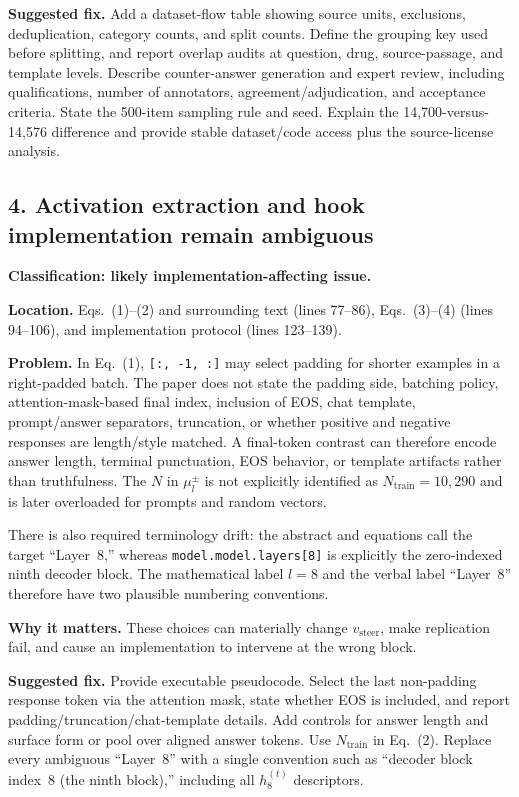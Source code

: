 \documentclass[11pt]{article}
\newcommand{\status}[1]{\textbf{#1}}
\begin{document}
\status{Suggested fix.} Add a dataset-flow table showing source units, exclusions, deduplication, category counts, and split counts.  Define the grouping key used before splitting, and report overlap audits at question, drug, source-passage, and template levels.  Describe counter-answer generation and expert review, including qualifications, number of annotators, agreement/adjudication, and acceptance criteria.  State the 500-item sampling rule and seed.  Explain the 14,700-versus-14,576 difference and provide stable dataset/code access plus the source-license analysis.

\subsection*{4. Activation extraction and hook implementation remain ambiguous}

\status{Classification: likely implementation-affecting issue.}

\status{Location.} Eqs.~(1)--(2) and surrounding text (lines 77--86), Eqs.~(3)--(4) (lines 94--106), and implementation protocol (lines 123--139).

\status{Problem.} In Eq.~(1), \texttt{[:, -1, :]} may select padding for shorter examples in a right-padded batch.  The paper does not state the padding side, batching policy, attention-mask-based final index, inclusion of EOS, chat template, prompt/answer separators, truncation, or whether positive and negative responses are length/style matched.  A final-token contrast can therefore encode answer length, terminal punctuation, EOS behavior, or template artifacts rather than truthfulness.  The $N$ in $\mu_l^\pm$ is not explicitly identified as $N_{\mathrm{train}}=10{,}290$ and is later overloaded for prompts and random vectors.

There is also required terminology drift: the abstract and equations call the target ``Layer~8,'' whereas \texttt{model.model.layers[8]} is explicitly the zero-indexed ninth decoder block.  The mathematical label $l=8$ and the verbal label ``Layer~8'' therefore have two plausible numbering conventions.

\status{Why it matters.} These choices can materially change $v_{\text{steer}}$, make replication fail, and cause an implementation to intervene at the wrong block.

\status{Suggested fix.} Provide executable pseudocode.  Select the last non-padding response token via the attention mask, state whether EOS is included, and report padding/truncation/chat-template details.  Add controls for answer length and surface form or pool over aligned answer tokens.  Use $N_{\mathrm{train}}$ in Eq.~(2).  Replace every ambiguous ``Layer~8'' with a single convention such as ``decoder block index~8 (the ninth block),'' including all $h_8^{(t)}$ descriptors.
\end{document}
